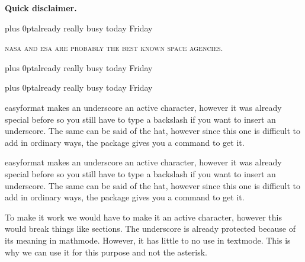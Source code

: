 \documentclass{article}
\begin{document}
\bfseries Quick disclaimer.

\parbox{230pt}{\parfillskip=0pt plus 0pt\relax already really busy today Friday\par}

{\scshape nasa and esa are probably the best known space agencies.

\parbox{230pt}{\parfillskip=0pt plus 0pt\relax already really busy today Friday\par}}

\parbox{230pt}{\parfillskip=0pt plus 0pt\relax already really busy today Friday\par}

\parbox{385pt}{easyformat makes an underscore an active character, however it was already special before so you still have to type a backslash if you want to insert an underscore. The same can be said of the hat, however since this one is difficult to add in ordinary ways, the package gives you a command to get it.}

\parbox{300pt}{easyformat makes an underscore an active character, however it was already special before so you still have to type a backslash if you want to insert an underscore. The same can be said of the hat, however since this one is difficult to add in ordinary ways, the package gives you a command to get it.}

\parbox{250pt}{To make it work we would have to make it an active character, however this would break things like sections. The underscore is already protected because of its meaning in mathmode. However, it has little to no use in textmode. This is why we can use it for this purpose and not the asterisk.}
\end{document}

